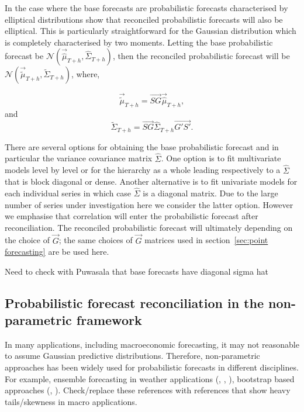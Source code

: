 \documentclass[graybox]{svmult}
\begin{document}
In the case where the base forecasts are probabilistic forecasts characterised by elliptical distributions \cite{Gamakumara2018} show that reconciled probabilistic forecasts will also be elliptical.  This is particularly straightforward for the Gaussian distribution which is completely characterised by two moments.  Letting the base probabilistic forecast be $\mathscr{N}(\vec{\hat{\mu}}_{T+h}, \hat{\Sigma}_{T+h})$, then the reconciled probabilistic forecast will be $\mathscr{N}(\vec{\tilde{\mu}}_{T+h}, \tilde{\Sigma}_{T+h})$, where,

\begin{equation}\label{eq:17}
\vec{\tilde{\mu}}_{T+h} = \vec{SG}\vec{\hat{\mu}}_{T+h},
\end{equation}
and
\begin{equation}\label{eq:18}
\tilde{\Sigma}_{T+h} = \vec{SG}\hat{\Sigma}_{T+h}\vec{G'S'}.
\end{equation}

There are several options for obtaining the base probabilistic forecast and in particular the variance covariance matrix $\hat{\Sigma}$.  One option is to fit multivariate models level by level or for the hierarchy as a whole leading respectively to a $\hat{\Sigma}$ that is block diagonal or dense.  Another alternative is to fit univariate models for each individual series in which case $\hat{\Sigma}$ is a diagonal matrix. Due to the large number of series under investigation here we consider the latter option.  However we emphasise that correlation will enter the probabilistic forecast after reconciliation.  The reconciled probabilistic forecast will ultimately depending on the choice of $\vec{G}$; the same choices of $\vec{G}$ matrices used in section~\ref{sec:point forecasting} are be used here.

{\color{red} Need to check with Puwasala that base forecasts have diagonal sigma hat}

\subsection{Probabilistic forecast reconciliation in the non-parametric framework}

In many applications, including macroeconomic forecasting, it may not reasonable to assume Gaussian predictive distributions. Therefore, non-parametric approaches has been widely used for probabilistic forecasts in different disciplines. For example, ensemble forecasting in weather applications (\cite{Gneiting2005}, \cite{Gneiting2014}, \cite{Gneiting2008}), bootstrap based approaches (\cite{Manzan2008}, \cite{Vilar2013}). {\color{red} Check/replace these references with references that show heavy tails/skewness in macro applications.}
\end{document}
